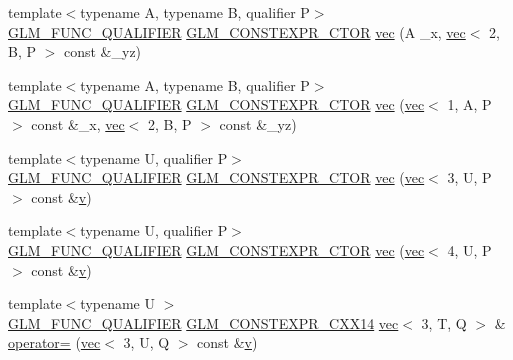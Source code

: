\begin{DoxyCompactItemize}
\item 
{\footnotesize template$<$typename A, typename B, qualifier P$>$ }\\\hyperlink{setup_8hpp_a33fdea6f91c5f834105f7415e2a64407}{G\+L\+M\+\_\+\+F\+U\+N\+C\+\_\+\+Q\+U\+A\+L\+I\+F\+I\+ER} \hyperlink{setup_8hpp_ad34178a09666081abdb573c14d1f4a5a}{G\+L\+M\+\_\+\+C\+O\+N\+S\+T\+E\+X\+P\+R\+\_\+\+C\+T\+OR} \hyperlink{structglm_1_1vec_3_013_00_01_t_00_01_q_01_4_a901f1c696deb619cbd26555bc7b08513}{vec} (A \+\_\+x, \hyperlink{structglm_1_1vec}{vec}$<$ 2, B, P $>$ const \&\+\_\+yz)
\item 
{\footnotesize template$<$typename A, typename B, qualifier P$>$ }\\\hyperlink{setup_8hpp_a33fdea6f91c5f834105f7415e2a64407}{G\+L\+M\+\_\+\+F\+U\+N\+C\+\_\+\+Q\+U\+A\+L\+I\+F\+I\+ER} \hyperlink{setup_8hpp_ad34178a09666081abdb573c14d1f4a5a}{G\+L\+M\+\_\+\+C\+O\+N\+S\+T\+E\+X\+P\+R\+\_\+\+C\+T\+OR} \hyperlink{structglm_1_1vec_3_013_00_01_t_00_01_q_01_4_a1f6418de9fddeaf4b97c9743808b3496}{vec} (\hyperlink{structglm_1_1vec}{vec}$<$ 1, A, P $>$ const \&\+\_\+x, \hyperlink{structglm_1_1vec}{vec}$<$ 2, B, P $>$ const \&\+\_\+yz)
\item 
{\footnotesize template$<$typename U, qualifier P$>$ }\\\hyperlink{setup_8hpp_a33fdea6f91c5f834105f7415e2a64407}{G\+L\+M\+\_\+\+F\+U\+N\+C\+\_\+\+Q\+U\+A\+L\+I\+F\+I\+ER} \hyperlink{setup_8hpp_ad34178a09666081abdb573c14d1f4a5a}{G\+L\+M\+\_\+\+C\+O\+N\+S\+T\+E\+X\+P\+R\+\_\+\+C\+T\+OR} \hyperlink{structglm_1_1vec_3_013_00_01_t_00_01_q_01_4_a9f3cdc2f03db0bc50512e16a64cdb4aa}{vec} (\hyperlink{structglm_1_1vec}{vec}$<$ 3, U, P $>$ const \&\hyperlink{_s_d_l__opengl_8h_a10a82eabcb59d2fcd74acee063775f90}{v})
\item 
{\footnotesize template$<$typename U, qualifier P$>$ }\\\hyperlink{setup_8hpp_a33fdea6f91c5f834105f7415e2a64407}{G\+L\+M\+\_\+\+F\+U\+N\+C\+\_\+\+Q\+U\+A\+L\+I\+F\+I\+ER} \hyperlink{setup_8hpp_ad34178a09666081abdb573c14d1f4a5a}{G\+L\+M\+\_\+\+C\+O\+N\+S\+T\+E\+X\+P\+R\+\_\+\+C\+T\+OR} \hyperlink{structglm_1_1vec_3_013_00_01_t_00_01_q_01_4_a71c4b9fad3b06926109f1f8fa74f6064}{vec} (\hyperlink{structglm_1_1vec}{vec}$<$ 4, U, P $>$ const \&\hyperlink{_s_d_l__opengl_8h_a10a82eabcb59d2fcd74acee063775f90}{v})
\item 
{\footnotesize template$<$typename U $>$ }\\\hyperlink{setup_8hpp_a33fdea6f91c5f834105f7415e2a64407}{G\+L\+M\+\_\+\+F\+U\+N\+C\+\_\+\+Q\+U\+A\+L\+I\+F\+I\+ER} \hyperlink{setup_8hpp_a4dd12abf5e1164bc57f3a34671d03844}{G\+L\+M\+\_\+\+C\+O\+N\+S\+T\+E\+X\+P\+R\+\_\+\+C\+X\+X14} \hyperlink{structglm_1_1vec}{vec}$<$ 3, T, Q $>$ \& \hyperlink{structglm_1_1vec_3_013_00_01_t_00_01_q_01_4_a8d40afef0f44dc9e5c765029f6af40df}{operator=} (\hyperlink{structglm_1_1vec}{vec}$<$ 3, U, Q $>$ const \&\hyperlink{_s_d_l__opengl_8h_a10a82eabcb59d2fcd74acee063775f90}{v})

\end{DoxyCompactItemize}
